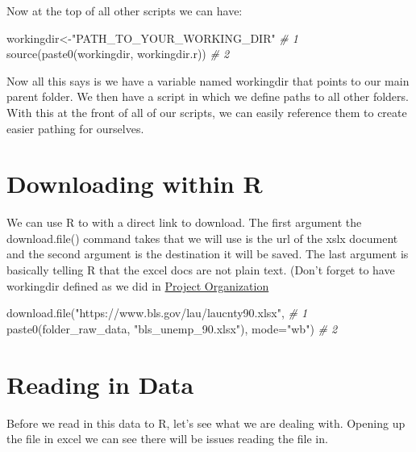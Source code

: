 \documentclass[
]{book}
\newenvironment{Shaded}{\begin{snugshade}}{\end{snugshade}}
\newcommand{\AttributeTok}[1]{\textcolor[rgb]{0.77,0.63,0.00}{#1}}
\newcommand{\CommentTok}[1]{\textcolor[rgb]{0.56,0.35,0.01}{\textit{#1}}}
\newcommand{\FunctionTok}[1]{\textcolor[rgb]{0.00,0.00,0.00}{#1}}
\newcommand{\NormalTok}[1]{#1}
\newcommand{\OtherTok}[1]{\textcolor[rgb]{0.56,0.35,0.01}{#1}}
\newcommand{\StringTok}[1]{\textcolor[rgb]{0.31,0.60,0.02}{#1}}
\begin{document}
Now at the top of all other scripts we can have:

\begin{Shaded}
\begin{Highlighting}[]
\NormalTok{workingdir}\OtherTok{\textless{}{-}}\StringTok{"PATH\_TO\_YOUR\_WORKING\_DIR"}    \CommentTok{\# 1}
\FunctionTok{source}\NormalTok{(}\FunctionTok{paste0}\NormalTok{(workingdir, workingdir.r))  }\CommentTok{\# 2}
\end{Highlighting}
\end{Shaded}

Now all this says is we have a variable named workingdir that points to our main parent folder. We then have a script in which we define paths to all other folders. With this at the front of all of our scripts, we can easily reference them to create easier pathing for ourselves.

\hypertarget{downloading-within-r}{%
\section{Downloading within R}\label{downloading-within-r}}

We can use R to with a direct link to download. The first argument the download.file() command takes that we will use is the url of the xslx document and the second argument is the destination it will be saved. The last argument is basically telling R that the excel docs are not plain text. (Don't forget to have workingdir defined as we did in \href{https://jmwestenberg.github.io/courses/rcourse/intro/lesson1_03/}{Project Organization}

\begin{Shaded}
\begin{Highlighting}[]
\FunctionTok{download.file}\NormalTok{(}\StringTok{"https://www.bls.gov/lau/laucnty90.xlsx"}\NormalTok{,     }\CommentTok{\# 1}
  \FunctionTok{paste0}\NormalTok{(folder\_raw\_data, }\StringTok{"bls\_unemp\_90.xlsx"}\NormalTok{), }\AttributeTok{mode=}\StringTok{"wb"}\NormalTok{)  }\CommentTok{\# 2}
\end{Highlighting}
\end{Shaded}

\hypertarget{reading-in-data}{%
\section{Reading in Data}\label{reading-in-data}}

Before we read in this data to R, let's see what we are dealing with. Opening up the file in excel we can see there will be issues reading the file in.
\end{document}
